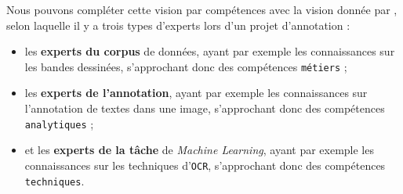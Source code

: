 		\begin{leftBarInformation}
			Nous pouvons compléter cette vision par compétences avec la vision donnée par \cite{fort:2017:experts-ou-foule}, selon laquelle il y a trois types d'experts lors d'un projet d'annotation :
			\begin{itemize}
				\item les \textbf{experts du corpus} de données, ayant par exemple les connaissances sur les bandes dessinées, s'approchant donc des compétences \texttt{métiers} ;
				\item les \textbf{experts de l'annotation}, ayant par exemple les connaissances sur l'annotation de textes dans une image, s'approchant donc des compétences \texttt{analytiques} ;
				\item et les \textbf{experts de la tâche} de \textit{Machine Learning}, ayant par exemple les connaissances sur les techniques d'\texttt{OCR}, s'approchant donc des compétences \texttt{techniques}.
			\end{itemize}
		\end{leftBarInformation}
		
